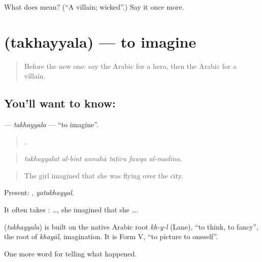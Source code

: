\begin{tcolorbox}[breakable,colback=teal!4,colframe=teal!35!black,title={Before you move on}]
What does  mean? (\textquotedblleft{}A villain; wicked\textquotedblright{}.) Say it once more.
\end{tcolorbox}
\section[\texorpdfstring{\ar{تخيل} (takhayyala)}{تخيل (takhayyala)}]{ (takhayyala) — to imagine}

\label{lesson:AR-C303-takhayyala}



\begin{quote}
Before the new one: say the Arabic for a hero, then the Arabic for a villain.
\end{quote}

\subsection*{You'll want to know: }
\textbf{} — \emph{takhayyala} — \textquotedblleft{}to imagine\textquotedblright{}.

\begin{quote}
     .
\end{quote}

\begin{quote}
\emph{takhayyalat al-bint annahā taṭīru fawqa al-madīna.}
\end{quote}

\begin{quote}
The girl imagined that she was flying over the city.
\end{quote}

Present: , \emph{yatakhayyal}.

It often takes :   …, she imagined that she ….

\begin{cousinweb}
\textbf{} (\emph{takhayyala}) is built on the native Arabic root \emph{kh-y-l} (Lane), \textquotedblleft{}to think, to fancy\textquotedblright{}, the root of \emph{khayāl}, imagination. It is Form V, \textquotedblleft{}to picture to oneself\textquotedblright{}.
\end{cousinweb}

\begin{grammarlens}[title={What you've built}]
One more word for telling what happened.
\end{grammarlens}

